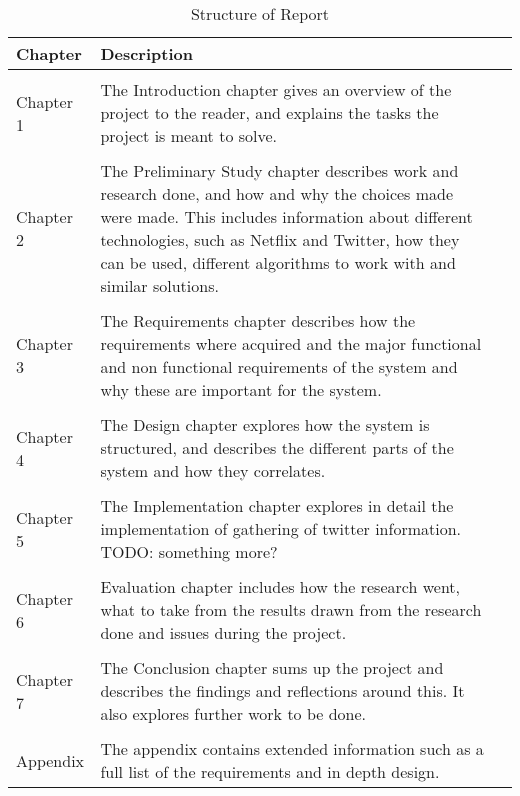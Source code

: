 \begin{table}
\centering
\begin{tabularx}{\textwidth}{ l X l }
  \textbf{Chapter}      & \textbf{Description} \\
  \hline \\ [-1.5ex]
  Chapter 1 & The Introduction chapter gives an overview of the project to the reader, and explains the tasks the project is meant to solve. \\
  \hline \\ [-1.5ex]
  Chapter 2 & The Preliminary Study chapter describes work and research done, and how and why the choices made were made. This includes information about different technologies, such as Netflix and Twitter, how they can be used, different algorithms to work with and similar solutions. \\
  \hline \\ [-1.5ex]
  Chapter 3 & The Requirements chapter describes how the requirements where acquired and the major functional and non functional requirements of the system and why these are important for the system. \\
  \hline \\ [-1.5ex]
  Chapter 4 & The Design chapter explores how the system is structured, and describes the different parts of the system and how they correlates. \\
  \hline \\ [-1.5ex]
  Chapter 5 & The Implementation chapter explores in detail the implementation of gathering of twitter information. TODO: something more?  \\
  \hline \\ [-1.5ex]
  Chapter 6 & Evaluation chapter includes how the research went, what to take from the results drawn from the research done and issues during the project. \\
  \hline \\ [-1.5ex]
  Chapter 7 & The Conclusion chapter sums up the project and describes the findings and reflections around this. It also explores further work to be done. \\
  \hline \\ [-1.5ex]
  Appendix & The appendix contains extended information such as a full list of the requirements and in depth design. \\
\end{tabularx}
\caption{Structure of Report}
\label{table-reportstructure}
\end{table}
